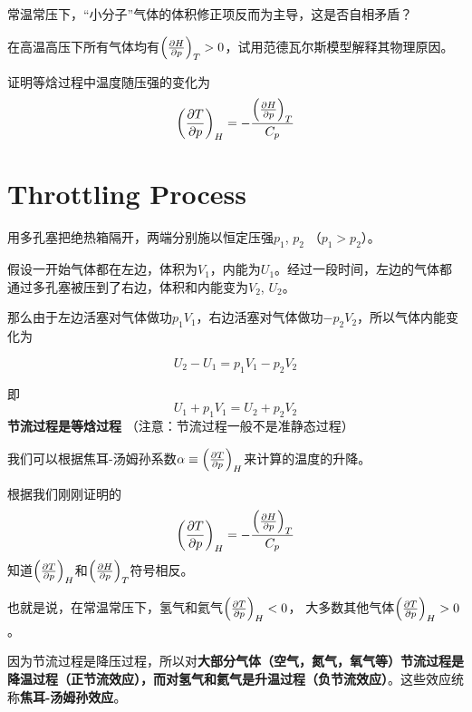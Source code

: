 \documentclass[CJK]{beamer}
\begin{document}
\begin{frame}
\bch
{}

常温常压下，“小分子”气体的体积修正项反而为主导，这是否自相矛盾？

\ech
\end{frame}


\begin{frame}
\bch
{}

在高温高压下所有气体均有$\left(\frac{\partial H}{\partial p}\right)_{T} > 0$，试用范德瓦尔斯模型解释其物理原因。

\ech
\end{frame}


\begin{frame}
\bch
{}
证明等焓过程中温度随压强的变化为
{\blue
$$\left(\frac{\partial T}{\partial p}\right)_{H} = - \frac{\left(\frac{\partial H}{\partial p}\right)_{T}}{C_p}$$
}
\ech
\end{frame}

\section{Throttling Process}

\begin{frame}
\bch

\emini
{}
用多孔塞把绝热箱隔开，两端分别施以恒定压强$p_1$, $p_2$ （$p_1>p_2$）。
\emini

{\small

假设一开始气体都在左边，体积为$V_1$，内能为$U_1$。经过一段时间，左边的气体都通过多孔塞被压到了右边，体积和内能变为$V_2$, $U_2$。

那么由于左边活塞对气体做功$p_1V_1$，右边活塞对气体做功$-p_2V_2$，所以气体内能变化为

$$U_2 - U_1  = p_1V_1 - p_2V_2$$

即
$$ U_1 + p_1V_1 = U_2 + p_2V_2 $$
{\blue \bf 节流过程是等焓过程} （注意：节流过程一般不是准静态过程）

}
\ech
\end{frame}



\begin{frame}
\bch
{\small
我们可以根据焦耳-汤姆孙系数$\alpha \equiv \left(\frac{\partial T}{\partial p}\right)_{H}$来计算的温度的升降。

根据我们刚刚证明的
$$\left(\frac{\partial T}{\partial p}\right)_{H} = - \frac{\left(\frac{\partial H}{\partial p}\right)_{T}}{C_p}$$
知道$\left(\frac{\partial T}{\partial p}\right)_{H}$和$\left(\frac{\partial H}{\partial p}\right)_{T}$符号相反。

也就是说，在常温常压下，氢气和氦气$\left(\frac{\partial T}{\partial p}\right)_{H} < 0$， 大多数其他气体$\left(\frac{\partial T}{\partial p}\right)_{H} > 0$。

因为节流过程是降压过程，所以对{\bf 大部分气体（空气，氮气，氧气等）节流过程是降温过程（正节流效应），而对氢气和氦气是升温过程（负节流效应）}。这些效应统称{\bf 焦耳-汤姆孙效应}。
}
\ech
\end{frame}
\end{document}
